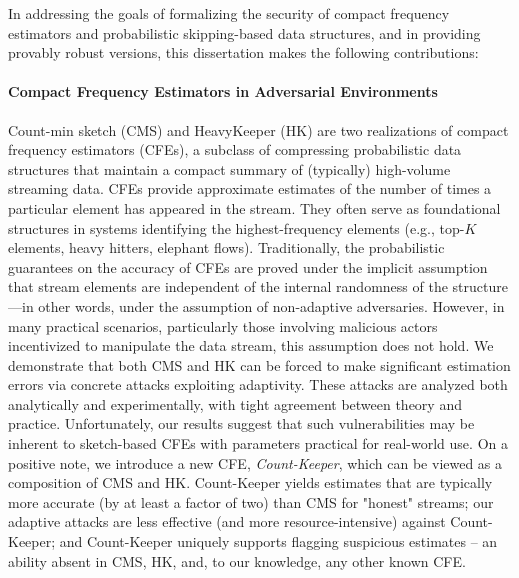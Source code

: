 In addressing the goals of formalizing the security of compact frequency estimators and probabilistic skipping-based data structures, and in providing provably robust versions, this dissertation makes the following contributions:

\paragraph{Compact Frequency Estimators in Adversarial Environments} Count-min sketch (CMS) and HeavyKeeper (HK) are two realizations of compact frequency estimators (CFEs), a subclass of compressing probabilistic data structures that maintain a compact summary of (typically) high-volume streaming data. CFEs provide approximate estimates of the number of times a particular element has appeared in the stream. They often serve as foundational structures in systems identifying the highest-frequency elements (e.g., top-$K$ elements, heavy hitters, elephant flows). Traditionally, the probabilistic guarantees on the accuracy of CFEs are proved under the implicit assumption that stream elements are independent of the internal randomness of the structure—in other words, under the assumption of non-adaptive adversaries. However, in many practical scenarios, particularly those involving malicious actors incentivized to manipulate the data stream, this assumption does not hold. We demonstrate that both CMS and HK can be forced to make significant estimation errors via concrete attacks exploiting adaptivity. These attacks are analyzed both analytically and experimentally, with tight agreement between theory and practice. Unfortunately, our results suggest that such vulnerabilities may be inherent to sketch-based CFEs with parameters practical for real-world use. On a positive note, we introduce a new CFE, \emph{Count-Keeper}, which can be viewed as a composition of CMS and HK. Count-Keeper yields estimates that are typically more accurate (by at least a factor of two) than CMS for "honest" streams; our adaptive attacks are less effective (and more resource-intensive) against Count-Keeper; and Count-Keeper uniquely supports flagging suspicious estimates -- an ability absent in CMS, HK, and, to our knowledge, any other known CFE.

